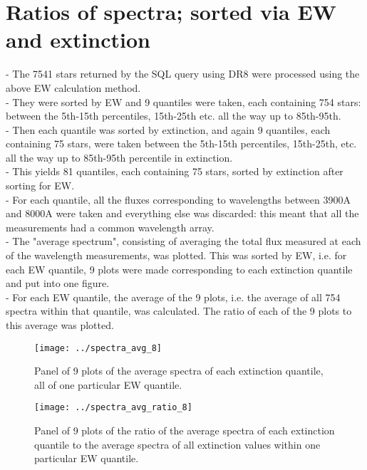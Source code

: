 \documentclass[12pt]{article}
\begin{document}
\section{Ratios of spectra; sorted via EW and extinction}
- The 7541 stars returned by the SQL query using DR8 were processed using the above EW calculation method.\\
- They were sorted by EW and 9 quantiles were taken, each containing 754 stars: between the 5th-15th percentiles, 15th-25th etc. all the way up to 85th-95th.\\
- Then each quantile was sorted by extinction, and again 9 quantiles, each containing 75 stars, were taken between the 5th-15th percentiles, 15th-25th, etc. all the way up to 85th-95th percentile in extinction.\\
- This yields 81 quantiles, each containing 75 stars, sorted by extinction after sorting for EW.\\
- For each quantile, all the fluxes corresponding to wavelengths between 3900A and 8000A were taken and everything else was discarded: this meant that all the measurements had a common wavelength array.\\
- The "average spectrum", consisting of averaging the total flux measured at each of the wavelength measurements, was plotted. This was sorted by EW, i.e. for each EW quantile, 9 plots were made corresponding to each extinction quantile and put into one figure.\\
- For each EW quantile, the average of the 9 plots, i.e. the average of all 754 spectra within that quantile, was calculated. The ratio of each of the 9 plots to this average was plotted.\\
\begin{figure}
\texttt{[image: ../spectra\_avg\_8]}\\
\caption{Panel of 9 plots of the average spectra of each extinction quantile, all of one particular EW quantile.}
\end{figure}
\begin{figure}
\texttt{[image: ../spectra\_avg\_ratio\_8]}\\
\caption{Panel of 9 plots of the ratio of the average spectra of each extinction quantile to the average spectra of all extinction values within one particular EW quantile.}
\end{figure}
\end{document}
